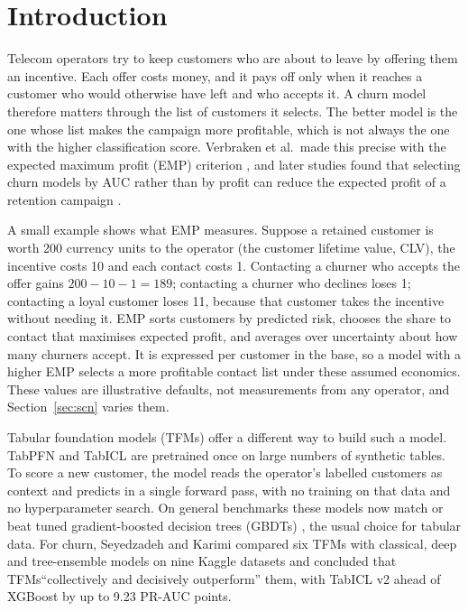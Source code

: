 \documentclass[11pt]{article}
\newcommand{\tfms}{TFMs\xspace}
\begin{document}
\section{Introduction}

Telecom operators try to keep customers who are about to leave by offering them an incentive. Each offer costs money,
and it pays off only when it reaches a customer who would otherwise have left and who accepts it. A churn model
therefore matters through the list of customers it selects. The better model is the one whose list makes the campaign
more profitable, which is not always the one with the higher classification score. Verbraken et al.\ made this precise
with the expected maximum profit (EMP) criterion \cite{verbraken2013emp}, and later studies found that selecting churn
models by AUC rather than by profit can reduce the expected profit of a retention campaign
\cite{verbeke2012newinsights,hoppner2020proftree,manzoor2025eprofits}.

A small example shows what EMP measures. Suppose a retained customer is worth 200 currency units to the operator (the
customer lifetime value, CLV), the incentive costs 10 and each contact costs 1. Contacting a churner who accepts the
offer gains $200-10-1=189$; contacting a churner who declines loses 1; contacting a loyal customer loses 11, because
that customer takes the incentive without needing it. EMP sorts customers by predicted risk, chooses the share to
contact that maximises expected profit, and averages over uncertainty about how many churners accept. It is expressed
per customer in the base, so a model with a higher EMP selects a more profitable contact list under these assumed
economics. These values are illustrative defaults, not measurements from any operator, and Section~\ref{sec:scn}
varies them.

Tabular foundation models (\tfms) offer a different way to build such a model. TabPFN
\cite{hollmann2025tabpfn,priorlabs2025tabpfn25,priorlabs2026tabpfn35} and TabICL \cite{qu2025tabicl,qu2026tabiclv2}
are pretrained once on large numbers of synthetic tables. To score a new customer, the model reads the operator's
labelled customers as context and predicts in a single forward pass, with no training on that data and no
hyperparameter search. On general benchmarks these models now match or beat tuned gradient-boosted decision trees
(GBDTs) \cite{erickson2025tabarena,qu2026tabiclv2,priorlabs2026tabpfn35}, the usual choice for tabular data. For churn,
Seyedzadeh and Karimi \cite{seyedzadeh2026churn} compared six \tfms with classical, deep and tree-ensemble models on nine
Kaggle datasets and concluded that \tfms ``collectively and decisively outperform'' them, with TabICL v2 ahead of
XGBoost by up to 9.23 PR-AUC points.
\end{document}
